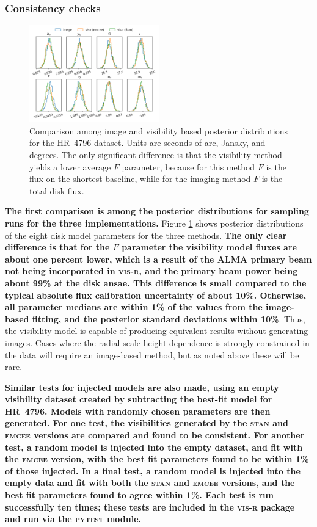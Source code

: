 \documentclass[fleqn,usenatbib]{mnras}
\begin{document}
\subsubsection{Consistency checks}

\begin{figure}
    \centering
    \includegraphics[width=0.5\textwidth]{comp.png}
    \caption{Comparison among image and visibility based posterior distributions for the HR~4796 dataset. Units are seconds of arc, Jansky, and degrees. The only significant difference is that the visibility method yields a lower average $F$ parameter, because for this method $F$ is the flux on the shortest baseline, while for the imaging method $F$ is the total disk flux.}
    \label{fig:comp}
\end{figure}

\textbf{The first comparison is among the posterior distributions for sampling runs for the three implementations.} Figure \ref{fig:comp} shows posterior distributions of the eight disk model parameters for the three methods. \textbf{The only clear difference is that for the $F$ parameter the visibility model fluxes are about one percent lower, which is a result of the ALMA primary beam not being incorporated in \textsc{vis-r}, and the primary beam power being about 99\% at the disk ansae. This difference is small compared to the typical absolute flux calibration uncertainty of about 10\%. Otherwise, all parameter medians are within 1\% of the values from the image-based fitting, and the posterior standard deviations within 10\%}. Thus, the visibility model is capable of producing equivalent results without generating images. Cases where the radial scale height dependence is strongly constrained in the data will require an image-based method, but as noted above these will be rare.

\textbf{Similar tests for injected models are also made, using an empty visibility dataset created by subtracting the best-fit model for HR~4796. Models with randomly chosen parameters are then generated. For one test, the visibilities generated by the \textsc{stan} and \textsc{emcee} versions are compared and found to be consistent. For another test, a random model is injected into the empty dataset, and fit with the \textsc{emcee} version, with the best fit parameters found to be within 1\% of those injected. In a final test, a random model is injected into the empty data and fit with both the \textsc{stan} and \textsc{emcee} versions, and the best fit parameters found to agree within 1\%. Each test is run successfully ten times; these tests are included in the \textsc{vis-r} package and run via the \textsc{pytest} module.}
\end{document}

